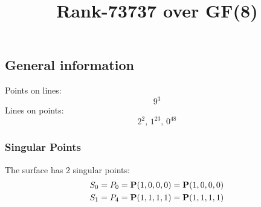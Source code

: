 \documentclass{article}
\newcommand\setTBstruts{\def\T{\rule{0pt}{2.6ex}}%
\def\B{\rule[-1.2ex]{0pt}{0pt}}}
\newcommand{\bP}{{\bf P}}
\begin{document}
 
\setTBstruts



{\allowdisplaybreaks%






\title{Rank-73737 over GF(8)}
\author{}%
\maketitle%
%
{}



\subsection*{General information}
Points on lines:
$$
9^3$$
Lines on points:
$$
2^2,\,1^{23},\,0^{48}$$
\subsubsection*{Singular Points}
The surface has 2 singular points:\\
\begin{align*}
S_{0} &= P_{0}=\bP(1, 0, 0, 0) = \bP(1, 0, 0, 0)\\
S_{1} &= P_{4}=\bP(1, 1, 1, 1) = \bP(1, 1, 1, 1)\\
\end{align*}
}
\end{document}
